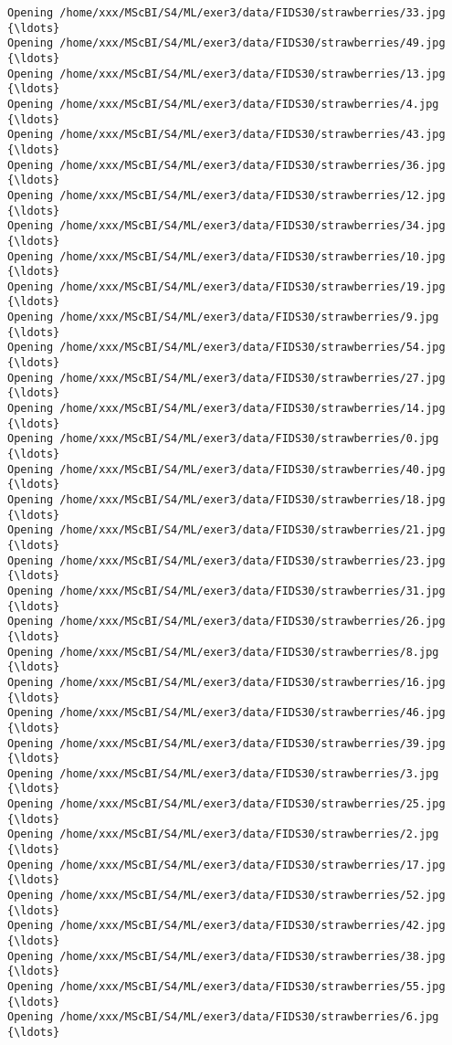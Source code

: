 \documentclass[11pt]{article}
\begin{document}
\begin{Verbatim}[commandchars=\\\{\}]
Opening /home/xxx/MScBI/S4/ML/exer3/data/FIDS30/strawberries/33.jpg  {\ldots}
Opening /home/xxx/MScBI/S4/ML/exer3/data/FIDS30/strawberries/49.jpg  {\ldots}
Opening /home/xxx/MScBI/S4/ML/exer3/data/FIDS30/strawberries/13.jpg  {\ldots}
Opening /home/xxx/MScBI/S4/ML/exer3/data/FIDS30/strawberries/4.jpg  {\ldots}
Opening /home/xxx/MScBI/S4/ML/exer3/data/FIDS30/strawberries/43.jpg  {\ldots}
Opening /home/xxx/MScBI/S4/ML/exer3/data/FIDS30/strawberries/36.jpg  {\ldots}
Opening /home/xxx/MScBI/S4/ML/exer3/data/FIDS30/strawberries/12.jpg  {\ldots}
Opening /home/xxx/MScBI/S4/ML/exer3/data/FIDS30/strawberries/34.jpg  {\ldots}
Opening /home/xxx/MScBI/S4/ML/exer3/data/FIDS30/strawberries/10.jpg  {\ldots}
Opening /home/xxx/MScBI/S4/ML/exer3/data/FIDS30/strawberries/19.jpg  {\ldots}
Opening /home/xxx/MScBI/S4/ML/exer3/data/FIDS30/strawberries/9.jpg  {\ldots}
Opening /home/xxx/MScBI/S4/ML/exer3/data/FIDS30/strawberries/54.jpg  {\ldots}
Opening /home/xxx/MScBI/S4/ML/exer3/data/FIDS30/strawberries/27.jpg  {\ldots}
Opening /home/xxx/MScBI/S4/ML/exer3/data/FIDS30/strawberries/14.jpg  {\ldots}
Opening /home/xxx/MScBI/S4/ML/exer3/data/FIDS30/strawberries/0.jpg  {\ldots}
Opening /home/xxx/MScBI/S4/ML/exer3/data/FIDS30/strawberries/40.jpg  {\ldots}
Opening /home/xxx/MScBI/S4/ML/exer3/data/FIDS30/strawberries/18.jpg  {\ldots}
Opening /home/xxx/MScBI/S4/ML/exer3/data/FIDS30/strawberries/21.jpg  {\ldots}
Opening /home/xxx/MScBI/S4/ML/exer3/data/FIDS30/strawberries/23.jpg  {\ldots}
Opening /home/xxx/MScBI/S4/ML/exer3/data/FIDS30/strawberries/31.jpg  {\ldots}
Opening /home/xxx/MScBI/S4/ML/exer3/data/FIDS30/strawberries/26.jpg  {\ldots}
Opening /home/xxx/MScBI/S4/ML/exer3/data/FIDS30/strawberries/8.jpg  {\ldots}
Opening /home/xxx/MScBI/S4/ML/exer3/data/FIDS30/strawberries/16.jpg  {\ldots}
Opening /home/xxx/MScBI/S4/ML/exer3/data/FIDS30/strawberries/46.jpg  {\ldots}
Opening /home/xxx/MScBI/S4/ML/exer3/data/FIDS30/strawberries/39.jpg  {\ldots}
Opening /home/xxx/MScBI/S4/ML/exer3/data/FIDS30/strawberries/3.jpg  {\ldots}
Opening /home/xxx/MScBI/S4/ML/exer3/data/FIDS30/strawberries/25.jpg  {\ldots}
Opening /home/xxx/MScBI/S4/ML/exer3/data/FIDS30/strawberries/2.jpg  {\ldots}
Opening /home/xxx/MScBI/S4/ML/exer3/data/FIDS30/strawberries/17.jpg  {\ldots}
Opening /home/xxx/MScBI/S4/ML/exer3/data/FIDS30/strawberries/52.jpg  {\ldots}
Opening /home/xxx/MScBI/S4/ML/exer3/data/FIDS30/strawberries/42.jpg  {\ldots}
Opening /home/xxx/MScBI/S4/ML/exer3/data/FIDS30/strawberries/38.jpg  {\ldots}
Opening /home/xxx/MScBI/S4/ML/exer3/data/FIDS30/strawberries/55.jpg  {\ldots}
Opening /home/xxx/MScBI/S4/ML/exer3/data/FIDS30/strawberries/6.jpg  {\ldots}

\end{Verbatim}
\end{document}
